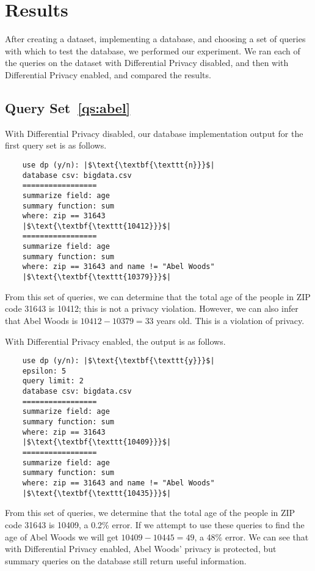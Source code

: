 \documentclass[conference,11pt]{IEEEtran}
\begin{document}
\section{Results}\label{sec:results}
After creating a dataset, implementing a database, and choosing a set of queries
with which to test the database, we performed our experiment. We ran each of the
queries on the dataset with Differential Privacy disabled, and then with Differential
Privacy enabled, and compared the results.

\subsection{Query Set~\ref{qs:abel}}

With Differential Privacy disabled, our database implementation output for the
first query set is as follows.
\begin{verbatim}
    use dp (y/n): |$\text{\textbf{\texttt{n}}}$|
    database csv: bigdata.csv
    =================
    summarize field: age
    summary function: sum
    where: zip == 31643
    |$\text{\textbf{\texttt{10412}}}$|
    =================
    summarize field: age
    summary function: sum
    where: zip == 31643 and name != "Abel Woods"
    |$\text{\textbf{\texttt{10379}}}$|
\end{verbatim}
From this set of  queries, we can determine that the total age of the people in ZIP
code 31643 is 10412; this is not a privacy violation. However, we can also infer that 
Abel Woods is $10412 - 10379 = 33$ years old. This is a violation of privacy.

With Differential Privacy enabled, the output is as follows.
\begin{verbatim}
    use dp (y/n): |$\text{\textbf{\texttt{y}}}$|
    epsilon: 5
    query limit: 2
    database csv: bigdata.csv
    =================
    summarize field: age
    summary function: sum
    where: zip == 31643
    |$\text{\textbf{\texttt{10409}}}$|
    =================
    summarize field: age
    summary function: sum
    where: zip == 31643 and name != "Abel Woods"
    |$\text{\textbf{\texttt{10435}}}$|
\end{verbatim}
From this set of queries, we determine that the total age of the people in ZIP
code 31643 is 10409, a 0.2\% error. If we attempt to use these queries to find
the age of Abel Woods we will get $10409 - 10445 = 49$, a 48\% error. We can see
that with Differential Privacy enabled, Abel Woods' privacy is protected, but summary
queries on the database still return useful information.
\end{document}
